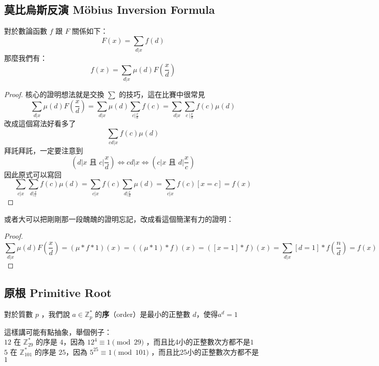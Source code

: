 \subsection{莫比烏斯反演 Möbius Inversion Formula}
\label{sec:mod:MIF}

\begin{theorem}
對於數論函數 $f$ 跟 $F$ 關係如下：
$$F\left(x\right)=\sum_{d\vert x} f\left( d\right)$$
那麼我們有：
$$f\left(x\right)=\sum_{d\vert x} \mu\left(d\right)F \left(\frac x d  \right)$$
\end{theorem}
\begin{proof}
核心的證明想法就是交換 $\sum$ 的技巧，這在比賽中很常見
$$\sum_{d\vert x} \mu(d)F \left(\frac x d  \right)=\sum_{d\vert x} \mu(d)\sum_{c|\frac x d} f(c)=\sum_{d\vert x}\sum_{c\ | \frac x d}f(c)\mu(d)$$
改成這個寫法好看多了
$$\sum_{cd|x} f(c)\mu(d)$$
拜託拜託，一定要注意到\\
$$(d|x\textsf{ 且 }c|\frac x d)\Leftrightarrow cd|x\Leftrightarrow (c|x \textsf{ 且 }d|\frac x c)$$ 
因此原式可以寫回
$$\sum_{c\vert x}\sum_{d|\frac x c} f(c)\mu(d)=\sum_{c|x} f(c)\sum_{d| \frac c d} \mu(d)=\sum_{c|x} f(c)[x=c]=f(x)$$
\end{proof}

或者大可以把剛剛那一段醜醜的證明忘記，改成看這個簡潔有力的證明：
\begin{proof}
$$\sum_{d|x} \mu(d)F(\frac x d)=(\mu*f*1)(x)=((\mu*1)*f)(x)=([x=1]*f)(x)=\sum_{d|x}[d=1]*f(\frac n d)=f(x)$$
\end{proof}



\subsection{原根 Primitive Root}
\label{sec:mod:primitive}

\begin{definition}
對於質數 $p$ ，我們說 $a\in\mathbb Z_p^*$ 的\textbf{序}（order）是最小的正整數 $d$，使得$a^d=1$
\end{definition}
這樣講可能有點抽象，舉個例子：\\
$12$ 在 $\mathbb Z_{29}^*$ 的序是 $4$，因為 $12^4\equiv 1\pmod {29}$
，而且比4小的正整數次方都不是$1$\\
$5$ 在 $\mathbb Z_{101}^*$ 的序是 $25$，因為 $5^{25}\equiv 1\pmod {101}$
，而且比25小的正整數次方都不是 $1$

